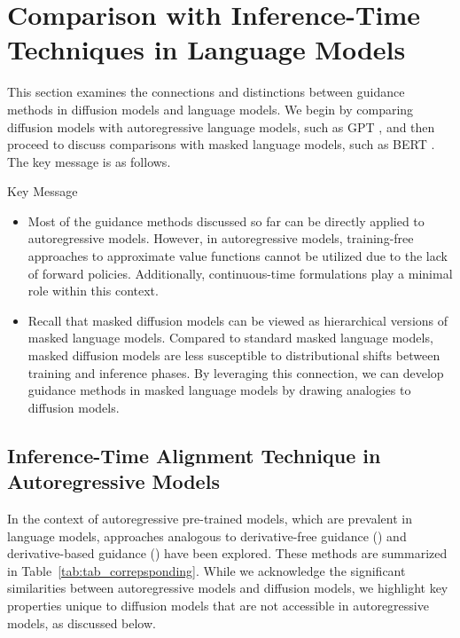 { \section{Comparison with Inference-Time Techniques in Language Models}\label{sec:autoregresstive}

{ This section examines the connections and distinctions between guidance methods in diffusion models and language models. We begin by comparing diffusion models with autoregressive language models, such as GPT \citep{brown2020language}, and then proceed to discuss comparisons with masked language models, such as BERT \citep{kenton2019bert}
. The key message is as follows. 

\begin{AIbox}{Key Message}
  \begin{itemize}
    
\item Most of the guidance methods discussed so far can be directly applied to autoregressive models. However, in autoregressive models, training-free approaches to approximate value functions cannot be utilized due to the lack of forward policies. Additionally, continuous-time formulations play a minimal role within this context.

\item Recall that masked diffusion models can be viewed as hierarchical versions of masked language models. Compared to standard masked language models, masked diffusion models are less susceptible to distributional shifts between training and inference phases. By leveraging this connection, we can develop guidance methods in masked language models by drawing analogies to diffusion models. 
  \end{itemize}
\end{AIbox}
} 

\subsection{Inference-Time Alignment Technique in Autoregressive Models}

In the context of autoregressive pre-trained models, which are prevalent in language models, approaches analogous to derivative-free guidance () and derivative-based guidance () have been explored. These methods are summarized in Table~\ref{tab:tab_correpsponding}. While we acknowledge the significant similarities between autoregressive models and diffusion models, we highlight key properties unique to diffusion models that are not accessible in autoregressive models, as discussed below.



}
